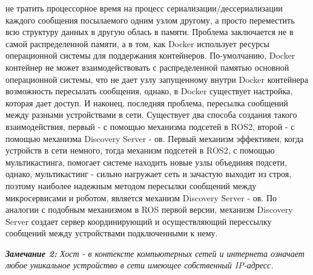 \documentclass[a4paper, 14pt]{extreport}
\begin{document}
не тратить процессорное время на процесс сериализации/дессериализации каждого сообщения посылаемого одним узлом другому, а просто
переместить всю структуру данных в другую облась в памяти. Проблема заключается не в самой распределенной памяти, а в том, как 
Docker использует ресурсы операционной системы для поддержания контейнеров. По-умолчанию, Docker контейнер не может взаимодействовать 
с распределенной памятью основной операционной системы, что не дает узлу запущенному внутри Docker контейнера возможность пересылать 
сообщения, однако, в Docker существует настройка, которая дает доступ. И наконец, последняя проблема, пересылка сообщений между 
разными устройствами в сети. Существует два способа создания такого взаимодействия, первый - с помощью механизма подсетей в ROS2, 
второй - с помощью механизма Discovery Server - ов. Первый механизм эффективен, когда устройств в сети немного, тогда механизм 
подсетей в ROS2, с помощью мультикастинга, помогает системе находить новые узлы объединяя подсети, однако, мультикастинг - сильно 
нагружает сеть и зачастую выходит из строя, поэтому наиболее надежным методом пересылки сообщений между микросервисами и роботом,
является механизм Discovery Server - ов. По аналогии с подобным механизмом в ROS первой версии, механизм Discovery Server создает
сервер координирующий и осуществляющий перессылку сообщений между устройствами подключенными к нему. 
\par\noindent \textsl{\textbf{Замечание 2:} Хост - в контексте компьютерных сетей и интернета означает любое уникальное устройство 
в сети имеющее собственный IP-адресс.}
\end{document}
